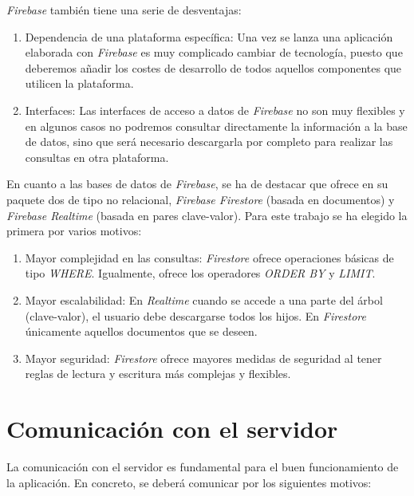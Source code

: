 \documentclass[twoside]{report}
\begin{document}
\textit{Firebase} también tiene una serie de desventajas:

\begin{enumerate}
\item Dependencia de una plataforma específica: Una vez se lanza una aplicación elaborada con \textit{Firebase} es muy complicado cambiar de tecnología, puesto que deberemos añadir los costes de desarrollo de todos aquellos componentes que utilicen la plataforma.

\item Interfaces: Las interfaces de acceso a datos de \textit{Firebase} no son muy flexibles y en algunos casos no podremos consultar directamente la información a la base de datos, sino que será necesario descargarla por completo para realizar las consultas en otra plataforma.

\end{enumerate}

En cuanto a las bases de datos de \textit{Firebase}, se ha de destacar que ofrece en su paquete dos de tipo no relacional, \textit{Firebase Firestore} (basada en documentos) y \textit{Firebase Realtime} (basada en pares clave-valor). Para este trabajo se ha elegido la primera por varios motivos:

\begin{enumerate}
\item Mayor complejidad en las consultas: \textit{Firestore} ofrece operaciones básicas de tipo \textit{WHERE}. Igualmente, ofrece los operadores \textit{ORDER BY} y \textit{LIMIT}.
\item Mayor escalabilidad: En \textit{Realtime} cuando se accede a una parte del árbol (clave-valor), el usuario debe descargarse todos los hijos. En \textit{Firestore} únicamente aquellos documentos que se deseen.
\item Mayor seguridad: \textit{Firestore} ofrece mayores medidas de seguridad al tener reglas de lectura y escritura más complejas y flexibles.
\end{enumerate}

\section{Comunicación con el servidor}
La comunicación con el servidor es fundamental para el buen funcionamiento de la aplicación. En concreto, se deberá comunicar por los siguientes motivos:
\end{document}
